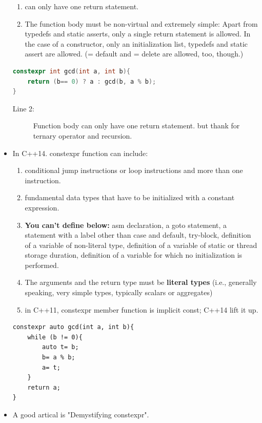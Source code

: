 \documentclass[a4paper,11pt,twoside]{book}
\begin{document}
\begin{itemize}
\begin{enumerate}
		\item can only have one return statement.
		
		\item The function body must be non-virtual and extremely simple: Apart from typedefs and static asserts, only a single return statement is allowed. In the case of a constructor, only an initialization list, typedefs and static assert are allowed. (= default and = delete are allowed, too, though.)
	\end{enumerate}

\begin{lstlisting}[frame=single, language=c++]
constexpr int gcd(int a, int b){
	return (b== 0) ? a : gcd(b, a % b);
}
\end{lstlisting}
\begin{description}
	\item[Line 2:] Function body can only have one return statement. but thank for ternary operator and recursion.
\end{description}
	
	\item In C++14. constexpr function can include: 
	\begin{enumerate}
		\item conditional jump instructions or loop instructions and more than one instruction.
		
		\item fundamental data types that have to be initialized with a constant expression.
		
		\item \textbf{You can't define below:} asm declaration, a goto statement, a statement with a label other than case and default, try-block, definition of a variable of non-literal type, definition of a variable of static or thread storage duration, definition of a variable for which no initialization is performed.
		
		\item The arguments and the return type must be \textbf{literal types} (i.e., generally speaking, very simple types, typically scalars or aggregates)
		
		\item in C++11, constexpr member function is implicit const; C++14 lift it up.
	\end{enumerate}
\begin{lstlisting}[numbers=none]
constexpr auto gcd(int a, int b){
	while (b != 0){
		auto t= b;
		b= a % b;
		a= t;
	}
	return a;
}
\end{lstlisting}
	
	\item A good artical is "Demystifying constexpr". 
\end{itemize}
\end{document}
